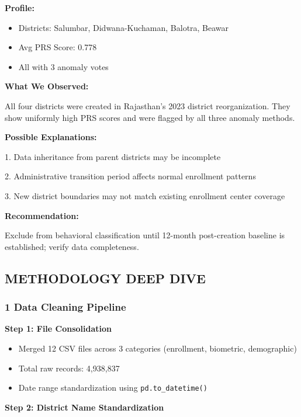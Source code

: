 \documentclass[11pt, a4paper]{article}
\begin{document}
\textbf{Profile:}


\begin{itemize}
\item Districts: Salumbar, Didwana-Kuchaman, Balotra, Beawar

\item Avg PRS Score: 0.778

\item All with 3 anomaly votes
\end{itemize}

\textbf{What We Observed:}

All four districts were created in Rajasthan's 2023 district reorganization. They show uniformly high PRS scores and were flagged by all three anomaly methods.


\textbf{Possible Explanations:}


1. Data inheritance from parent districts may be incomplete

2. Administrative transition period affects normal enrollment patterns

3. New district boundaries may not match existing enrollment center coverage


\textbf{Recommendation:}

Exclude from behavioral classification until 12-month post-creation baseline is established; verify data completeness.




\subsection{METHODOLOGY DEEP DIVE}

\subsubsection{1 Data Cleaning Pipeline}

\textbf{Step 1: File Consolidation}


\begin{itemize}
\item Merged 12 CSV files across 3 categories (enrollment, biometric, demographic)

\item Total raw records: 4,938,837

\item Date range standardization using \texttt{pd.to\_datetime()}
\end{itemize}

\textbf{Step 2: District Name Standardization}
\end{document}
